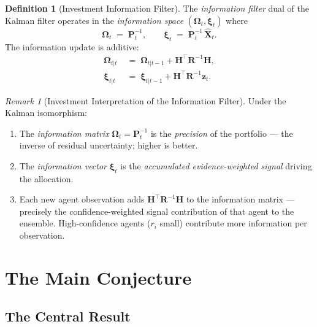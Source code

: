 \documentclass[12pt,openany]{book}
\newcommand{\bfOmega}{\boldsymbol{\Omega}}
\newcommand{\bfxi}{\boldsymbol{\xi}}
\numberwithin{equation}{chapter}
\theoremstyle{plain}
\theoremstyle{definition}
\newtheorem{definition}[theorem]{Definition}
\theoremstyle{remark}
\newtheorem{remark}[theorem]{Remark}
\begin{document}
\begin{definition}[Investment Information Filter]
\label{def:information-filter}
The \emph{information filter} dual of the Kalman filter operates
in the \emph{information space} $(\bfOmega_t, \bfxi_t)$ where
\begin{equation}
  \bfOmega_t \;=\; \mathbf{P}_t^{-1}, \qquad
  \bfxi_t \;=\; \mathbf{P}_t^{-1}\,\hat{\mathbf{X}}_t.
  \label{eq:information-space}
\end{equation}
The information update is additive:
\begin{align}
  \bfOmega_{t|t} &\;=\; \bfOmega_{t|t-1}
    + \mathbf{H}^\top\mathbf{R}^{-1}\mathbf{H},
  \label{eq:info-update-omega} \\
  \bfxi_{t|t} &\;=\; \bfxi_{t|t-1}
    + \mathbf{H}^\top\mathbf{R}^{-1}\mathbf{z}_t.
  \label{eq:info-update-xi}
\end{align}
\end{definition}

\begin{remark}[Investment Interpretation of the Information Filter]
\label{rem:information-filter}
Under the Kalman isomorphism:
\begin{enumerate}
  \item The \emph{information matrix} $\bfOmega_t = \mathbf{P}_t^{-1}$
        is the \emph{precision} of the portfolio — the inverse of
        residual uncertainty; higher is better.
  \item The \emph{information vector} $\bfxi_t$ is the
        \emph{accumulated evidence-weighted signal} driving the
        allocation.
  \item Each new agent observation adds
        $\mathbf{H}^\top\mathbf{R}^{-1}\mathbf{H}$ to the information
        matrix — precisely the confidence-weighted signal contribution
        of that agent to the ensemble.  High-confidence agents ($r_i$
        small) contribute more information per observation.
\end{enumerate}
\end{remark}

\chapter{The Main Conjecture}
\label{ch:conjecture}

\section{The Central Result}
\end{document}
